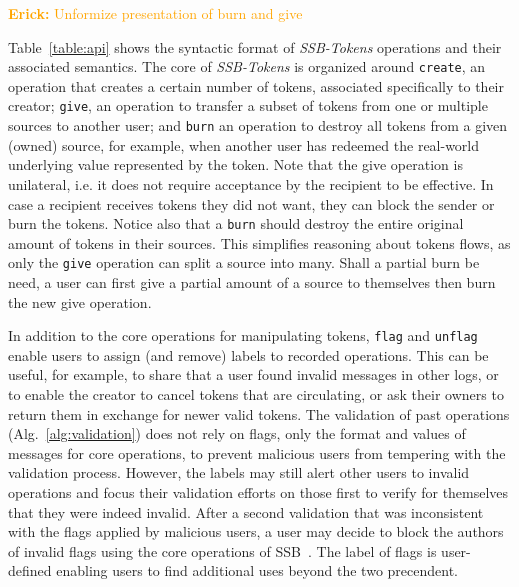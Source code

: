 \documentclass[sigplan,screen,10pt]{acmart}
\newcommand\el[1]{\textcolor{orange}{{\bf Erick: }#1}}
\newcommand\ssbtokens[0]{\textit{SSB-Tokens} }
\begin{document}
\el{Unformize presentation of burn and give}

Table~\ref{table:api} shows the syntactic format of \ssbtokens operations and their associated semantics. The core of \ssbtokens is organized around \texttt{create}, an operation that creates a certain number of tokens, associated specifically to their creator; \texttt{give}, an operation to transfer a subset of tokens from one or multiple sources to another user; and \texttt{burn} an operation to destroy all tokens from a given (owned) source, for example, when another user has redeemed the real-world underlying value represented by the token.  Note that the give operation is unilateral, i.e. it does not require acceptance by the recipient to be effective. In case a recipient receives tokens they did not want, they can block the sender or burn the tokens. Notice also that a \texttt{burn} should destroy the entire original amount of tokens in their sources. This simplifies reasoning about tokens flows, as only the \texttt{give} operation can split a source into many. Shall a partial burn be need, a user can first give a partial amount of a source to themselves then burn the new give operation.

In addition to the core operations for manipulating tokens, \texttt{flag} and \texttt{unflag} enable users to assign (and remove) labels to recorded operations. This can be useful, for example, to share that a user found invalid messages in other logs, or to enable the creator to cancel tokens that are circulating, or ask their owners to return them in exchange for newer valid tokens. The validation of past operations (Alg.~\ref{alg:validation}) does not rely on flags, only the format and values of messages for core operations, to prevent malicious users from tempering with the validation process. However, the labels may still alert other users to invalid operations and focus their validation efforts on those first to verify for themselves that they were indeed invalid. After a second validation that was inconsistent with the flags applied by malicious users, a user may decide to block the authors of invalid flags using the core operations of SSB~\cite{kermarrec2020gossiping}. The label of flags is user-defined enabling users to find additional uses beyond the two precendent.

\end{document}
